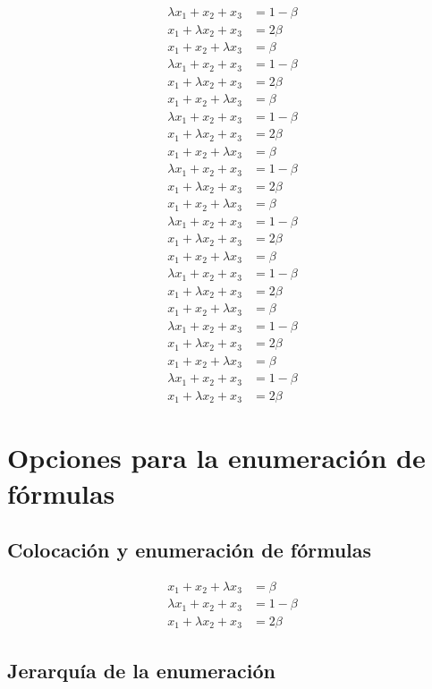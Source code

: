 \documentclass[12pt]{book}
\numberwithin{equation}{section}
\theoremstyle{plain}  %
\begin{document}
\begin{align*}
	\lambda x_1+x_2+x_3&=1-\beta\\
	x_1+\lambda x_2+x_3&=2\beta\\			x_1+x_2+\lambda x_3&=\beta\\
	\lambda x_1+x_2+x_3&=1-\beta\\
	x_1+\lambda x_2+x_3&=2\beta\\
				x_1+x_2+\lambda x_3&=\beta \\
	\lambda x_1+x_2+x_3&=1-\beta\\
	x_1+\lambda x_2+x_3&=2\beta\\
				x_1+x_2+\lambda x_3&=\beta\\
	\lambda x_1+x_2+x_3&=1-\beta\\
	x_1+\lambda x_2+x_3&=2\beta\\
				x_1+x_2+\lambda x_3&=\beta\\
	\lambda x_1+x_2+x_3&=1-\beta\\
	x_1+\lambda x_2+x_3&=2\beta\\
				x_1+x_2+\lambda x_3&=\beta\\
	\lambda x_1+x_2+x_3&=1-\beta\\
	x_1+\lambda x_2+x_3&=2\beta\\
				x_1+x_2+\lambda x_3&=\beta\\
	\lambda x_1+x_2+x_3&=1-\beta\\
	x_1+\lambda x_2+x_3&=2\beta\\
				x_1+x_2+\lambda x_3&=\beta\\
	\lambda x_1+x_2+x_3&=1-\beta\\
	x_1+\lambda x_2+x_3&=2\beta
\end{align*}

\chapter{Opciones para la enumeración de fórmulas}

\section{Colocación y enumeración de fórmulas}

\begin{align}
				x_1+x_2+\lambda x_3&=\beta\\
	\lambda x_1+x_2+x_3&=1-\beta\\
	x_1+\lambda x_2+x_3&=2\beta
\end{align}


\section{Jerarquía de la enumeración}
\end{document}
